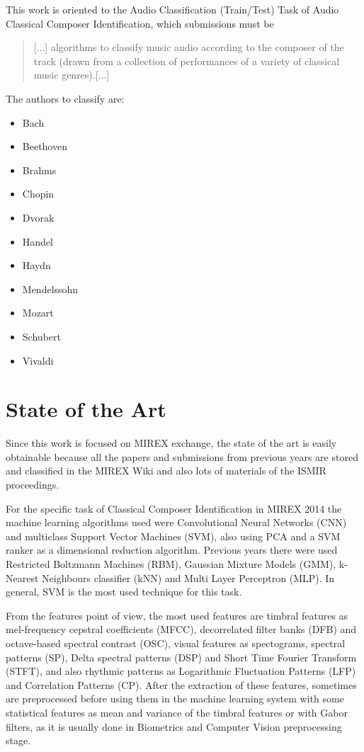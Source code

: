 \documentclass[a4paper,openany,oneside,12pt]{book}
\begin{document}
This work is oriented to the Audio Classification (Train/Test) Task of Audio Classical Composer Identification, which submissions must be
\begin{quote}
[...] algorithms to classify music audio according to the composer of the track (drawn from a collection of performances of a variety of classical music genres).[...]
\end{quote}

The authors to classify are:
\begin{itemize}
\item Bach
\item Beethoven
\item Brahms
\item Chopin
\item Dvorak
\item Handel
\item Haydn
\item Mendelssohn
\item Mozart
\item Schubert
\item Vivaldi 
\end{itemize}

\section{State of the Art}
Since this work is focused on MIREX exchange, the state of the art is easily obtainable because all the papers and submissions from previous years are stored and classified in the MIREX Wiki\cite{mirexWiki} and also lots of materials of the ISMIR proceedings\cite{ismirProc}.

For the specific task of Classical Composer Identification in MIREX 2014 the machine learning algorithms used were Convolutional Neural Networks (CNN)\cite{qiuqiang} and multiclass Support Vector Machines (SVM)\cite{seung-ryoel}\cite{shumin}\cite{ming}\cite{byun}, also using PCA\cite{shumin} and a SVM ranker\cite{seung-ryoel} as a dimensional reduction algorithm. Previous years there were used Restricted Boltzmann Machines (RBM)\cite{pikrakis}, Gaussian Mixture Models (GMM)\cite{franz}, k-Nearest Neighbours classifier (kNN) and Multi Layer Perceptron (MLP)\cite{hamel}. In general, SVM is the most used technique for this task.

From the features point of view, the most used features are timbral features as mel-frequency cepstral coefficients (MFCC)\cite{seung-ryoel}\cite{byun}\cite{franz}, decorrelated filter banks (DFB)\cite{seung-ryoel}\cite{byun} and octave-based spectral contrast (OSC)\cite{seung-ryoel}\cite{byun}, visual features as spectograms\cite{seung-ryoel}, spectral patterns (SP)\cite{klaus}, Delta spectral patterns (DSP)\cite{klaus} and Short Time Fourier Transform (STFT)\cite{qiuqiang}\cite{shumin}, and also rhythmic patterns as Logarithmic Fluctuation Patterns (LFP)\cite{klaus} and Correlation Patterns (CP)\cite{klaus}. After the extraction of these features, sometimes are preprocessed before using them in the machine learning system with some statistical features as mean and variance of the timbral features\cite{seung-ryoel} or with Gabor filters\cite{ming12}, as it is usually done in Biometrics and Computer Vision preprocessing stage.
\end{document}
